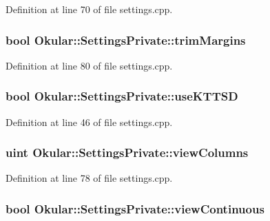 Definition at line 70 of file settings.\+cpp.

\hypertarget{classOkular_1_1SettingsPrivate_a4f646d665119edc0a8aafc58897816f0}{
\subsubsection[{trim\+Margins}]{\setlength{\rightskip}{0pt plus 5cm}bool Okular\+::\+Settings\+Private\+::trim\+Margins}}\label{classOkular_1_1SettingsPrivate_a4f646d665119edc0a8aafc58897816f0}


Definition at line 80 of file settings.\+cpp.

\hypertarget{classOkular_1_1SettingsPrivate_a9142816951c834f3bd7753b6746ef4c2}{
\subsubsection[{use\+K\+T\+T\+S\+D}]{\setlength{\rightskip}{0pt plus 5cm}bool Okular\+::\+Settings\+Private\+::use\+K\+T\+T\+S\+D}}\label{classOkular_1_1SettingsPrivate_a9142816951c834f3bd7753b6746ef4c2}


Definition at line 46 of file settings.\+cpp.

\hypertarget{classOkular_1_1SettingsPrivate_ad8904e535922fef778bc8b83639607d5}{
\subsubsection[{view\+Columns}]{\setlength{\rightskip}{0pt plus 5cm}uint Okular\+::\+Settings\+Private\+::view\+Columns}}\label{classOkular_1_1SettingsPrivate_ad8904e535922fef778bc8b83639607d5}


Definition at line 78 of file settings.\+cpp.

\hypertarget{classOkular_1_1SettingsPrivate_a105c4b8f8abe6b4543168f0cdc9629d2}{
\subsubsection[{view\+Continuous}]{\setlength{\rightskip}{0pt plus 5cm}bool Okular\+::\+Settings\+Private\+::view\+Continuous}}\label{classOkular_1_1SettingsPrivate_a105c4b8f8abe6b4543168f0cdc9629d2}


